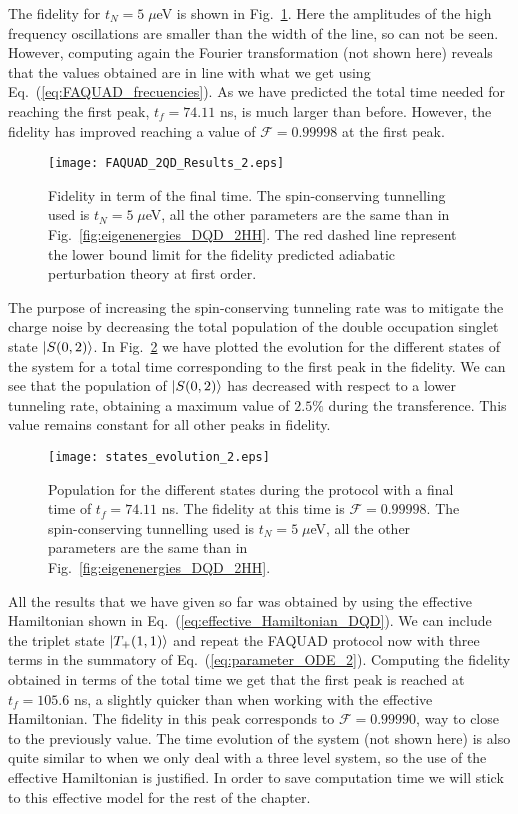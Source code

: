 The fidelity for $t_N=5 \; \mu$eV is shown in Fig.~\ref{fig:FAQUAD_2QD_Results_2}. Here the amplitudes of the high frequency oscillations are smaller than the width of the line, so can not be seen. However, computing again the Fourier transformation (not shown here) reveals that the values obtained are in line with what we get using Eq.~(\ref{eq:FAQUAD_frecuencies}). As we have predicted the total time needed for reaching the first peak, $t_f=74.11$ ns, is much larger than before. However, the fidelity has improved reaching a value of $\mathcal{F}=0.99998$ at the first peak.

\begin{figure}[!htb]
	\centering
	\texttt{[image: FAQUAD\_2QD\_Results\_2.eps]}
	\caption{Fidelity in term of the final time. The spin-conserving tunnelling used is $t_N=5\; \mu$eV, all the other parameters are the same than in Fig.~\ref{fig:eigenenergies_DQD_2HH}. The red dashed line represent the lower bound limit for the fidelity predicted adiabatic perturbation theory at first order.}
	\label{fig:FAQUAD_2QD_Results_2}
\end{figure}

The purpose of increasing the spin-conserving tunneling rate was to mitigate the charge noise by decreasing the total population of the double occupation singlet state $\ket{S(0,2)}$. In Fig.~\ref{fig:states_evolution_2} we have plotted the evolution for the different states of the system for a total time corresponding to the first peak in the fidelity. We can see that the population of $\ket{S(0,2)}$ has decreased with respect to a lower tunneling rate, obtaining a maximum value of $2.5\%$ during the transference. This value remains constant for all other peaks in fidelity.
\begin{figure}[!htb]
	\centering
	\texttt{[image: states\_evolution\_2.eps]}
	\caption{Population for the different states during the protocol with a final time of $t_f=74.11$ ns. The fidelity at this time is $\mathcal{F}=0.99998$. The spin-conserving tunnelling used is $t_N=5\; \mu$eV, all the other parameters are the same than in Fig.~\ref{fig:eigenenergies_DQD_2HH}.}
	\label{fig:states_evolution_2}
\end{figure}

All the results that we have given so far was obtained by using the effective Hamiltonian shown in Eq.~(\ref{eq:effective_Hamiltonian_DQD}). We can include the triplet state $\ket{T_+(1,1)}$ and repeat the FAQUAD protocol now with three terms in the summatory of Eq.~(\ref{eq:parameter_ODE_2}). Computing the fidelity obtained in terms of the total time we get that the first peak is reached at $t_f=105.6$ ns, a slightly quicker than when working with the effective Hamiltonian. The fidelity in this peak corresponds to $\mathcal{F}=0.99990$, way to close to the previously value. The time evolution of the system (not shown here) is also quite similar to when we only deal with a three level system, so the use of the effective Hamiltonian is justified. In order to save computation time we will stick to this effective model for the rest of the chapter.


